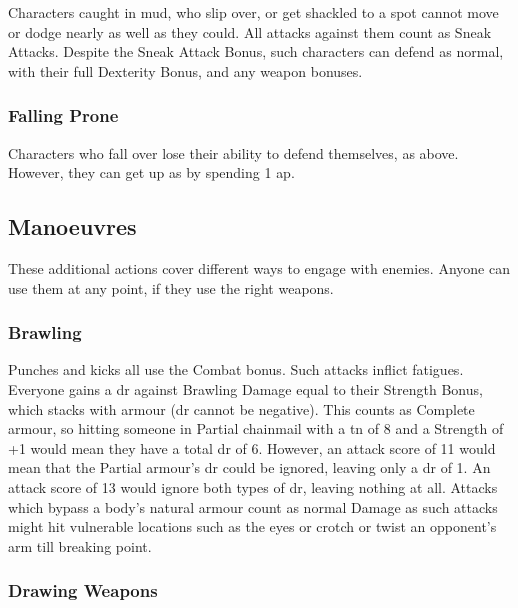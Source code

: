 \begin{multicols}{2}
Characters caught in mud, who slip over, or get shackled to a spot cannot move or dodge nearly as well as they could.
All attacks against them count as Sneak Attacks.
Despite the Sneak Attack Bonus, such characters can defend as normal, with their full Dexterity Bonus, and any weapon bonuses.

\subsubsection[Falling Prone: Same as `Trapped', but characters can spend a movement action to get up]{Falling Prone}
\label{prone}

Characters who fall over lose their ability to defend themselves, as above.
However, they can get up as by spending 1 \gls{ap}.

\subsection{Manoeuvres}

These additional actions cover different ways to engage with enemies.
Anyone can use them at any point, if they use the right weapons.

\subsubsection[Brawling: Make a normal attack roll, but any attack with a Margin less than 5 only inflicts \glspl{fatigue} rather than Damage]{Brawling}

Punches and kicks all use the Combat bonus.
Such attacks inflict \glspl{fatigue}.
Everyone gains a \gls{dr} against Brawling Damage equal to their Strength Bonus, which stacks with armour (\gls{dr} cannot be negative).
This counts as Complete armour, so hitting someone in Partial chainmail with a \gls{tn} of 8 and a Strength of +1 would mean they have a total \gls{dr} of 6.
However, an attack score of 11 would mean that the Partial armour's \gls{dr} could be ignored, leaving only a \gls{dr} of 1.
An attack score of 13 would ignore both types of \gls{dr}, leaving nothing at all.
Attacks which bypass a body's natural armour count as normal Damage as such attacks might hit vulnerable locations such as the eyes or crotch or twist an opponent's arm till breaking point.

\subsubsection[Drawing Weapon -- Cost: 1 \glsentrytext{ap}]{Drawing Weapons}


\end{multicols}
